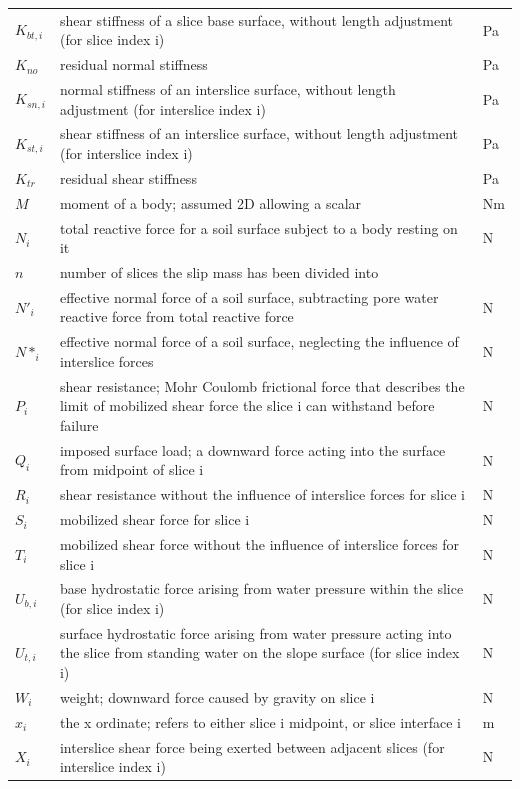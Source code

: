 \documentclass[12pt]{article}
\begin{document}
\begin{longtable*}{l l l}
\\
$K_{bt,i}$ & shear stiffness of a slice base surface, without length adjustment (for slice index i) & Pa
\\
$K_{no}$ & residual normal stiffness & Pa
\\
$K_{sn,i}$ & normal stiffness of an interslice surface, without length adjustment (for interslice index i) & Pa
\\
$K_{st,i}$ & shear stiffness of an interslice surface, without length adjustment (for interslice index i) & Pa
\\
$K_{tr}$ & residual shear stiffness & Pa
\\
$M$ & moment of a body; assumed 2D allowing a scalar & Nm
\\
$N_{i}$ & total reactive force for a soil surface subject to a body resting on it & N
\\
$n$ & number of slices the slip mass has been divided into & 
\\
$N'_{i}$ & effective normal force of a soil surface, subtracting pore water reactive force from total reactive force & N
\\
$N*_{i}$ & effective normal force of a soil surface, neglecting the influence of interslice forces & N
\\
$P_{i}$ & shear resistance; Mohr Coulomb frictional force that describes the limit of mobilized shear force the slice i can withstand before failure & N
\\
$Q_{i}$ & imposed surface load; a downward force acting into the surface from midpoint of slice i & N
\\
$R_{i}$ & shear resistance without the influence of interslice forces for slice i & N
\\
$S_{i}$ & mobilized shear force for slice i & N
\\
$T_{i}$ & mobilized shear force without the influence of interslice forces for slice i & N
\\
$U_{b,i}$ & base hydrostatic force arising from water pressure within the slice (for slice index i) & N
\\
$U_{t,i}$ & surface hydrostatic force arising from water pressure acting into the slice from standing water on the slope surface (for slice index i) & N
\\
$W_{i}$ & weight; downward force caused by gravity on slice i & N
\\
$x_{i}$ & the x ordinate; refers to either slice i midpoint, or slice interface i & m
\\
$X_{i}$ & interslice shear force being exerted between adjacent slices (for interslice index i) & N

\end{longtable*}
\end{document}
